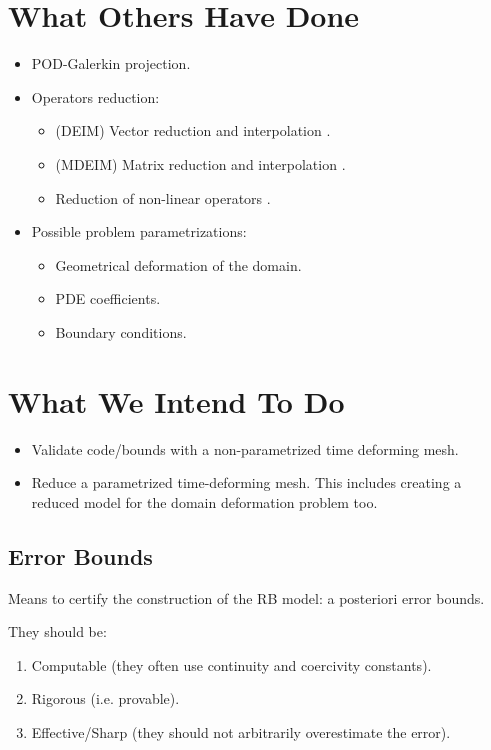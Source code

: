 \documentclass[../main.tex]{subfiles}
\begin{document}
\section{What Others Have Done}
\begin{itemize}
    \item POD-Galerkin projection.
    \item Operators reduction:
    \begin{itemize}
        \item (DEIM) Vector reduction and interpolation \cite{2010_nonlinearModelReductionDeim_chaturantabut}.
        \item (MDEIM) Matrix reduction and interpolation \cite{2015_efficientModelReductionParametrizedSystemsMatrixDeim_Negri}.
        \item Reduction of non-linear operators \cite{2018_podDeimReducedOrderModelDeformingMeshAeroelasticApplications_Donfrancesco}.
    \end{itemize}
    \item Possible problem parametrizations: 
    \begin{itemize}
        \item Geometrical deformation of the domain.
        \item PDE coefficients.
        \item Boundary conditions.
    \end{itemize}
\end{itemize}

\section{What We Intend To Do}

\begin{itemize}
    \item Validate code/bounds with a non-parametrized time deforming mesh.
    \item Reduce a parametrized time-deforming mesh. This includes creating a reduced model for the domain deformation problem too.
\end{itemize}

\subsection{Error Bounds}
Means to certify the construction of the RB model: a posteriori error bounds.

They should be:
\begin{enumerate}
    \item Computable (they often use continuity and coercivity constants).
    \item Rigorous (i.e. provable).
    \item Effective/Sharp (they should not arbitrarily overestimate the error).
\end{enumerate}
\end{document}
